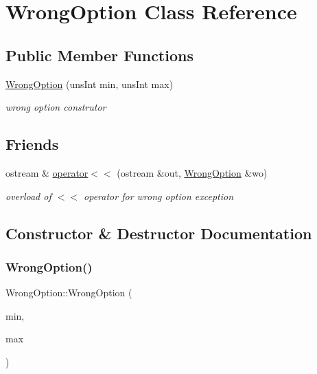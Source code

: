 \hypertarget{class_wrong_option}{}\section{Wrong\+Option Class Reference}
\label{class_wrong_option}
\subsection*{Public Member Functions}
\begin{DoxyCompactItemize}
\item 
\hyperlink{class_wrong_option_ad167d8d4a022b1069a78b0be521cb09f}{Wrong\+Option} (uns\+Int min, uns\+Int max)
\begin{DoxyCompactList}\small\item\em wrong option construtor \end{DoxyCompactList}\end{DoxyCompactItemize}
\subsection*{Friends}
\begin{DoxyCompactItemize}
\item 
ostream \& \hyperlink{class_wrong_option_a272717a9c47de3cdf605f30ccc0b7c08}{operator$<$$<$} (ostream \&out, \hyperlink{class_wrong_option}{Wrong\+Option} \&wo)
\begin{DoxyCompactList}\small\item\em overload of $<$$<$ operator for wrong option exception \end{DoxyCompactList}\end{DoxyCompactItemize}


\subsection{Constructor \& Destructor Documentation}
\hypertarget{class_wrong_option_ad167d8d4a022b1069a78b0be521cb09f}{}\label{class_wrong_option_ad167d8d4a022b1069a78b0be521cb09f} 
\subsubsection{\texorpdfstring{Wrong\+Option()}{WrongOption()}}
{\footnotesize\ttfamily Wrong\+Option\+::\+Wrong\+Option (\begin{DoxyParamCaption}\item[{uns\+Int}]{min,  }\item[{uns\+Int}]{max }\end{DoxyParamCaption})\hspace{0.3cm}{\ttfamily [inline]}}



